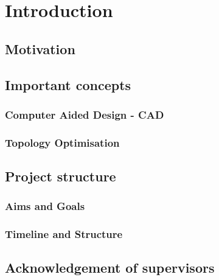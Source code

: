 \chapter{Introduction}
\label{chapter:Introduction}

\section{Motivation}


\section{Important concepts}

\subsection{Computer Aided Design - CAD}

\subsection{Topology Optimisation}

\section{Project structure}
\subsection{Aims and Goals}
\subsection{Timeline and Structure}

\section{Acknowledgement of supervisors}



